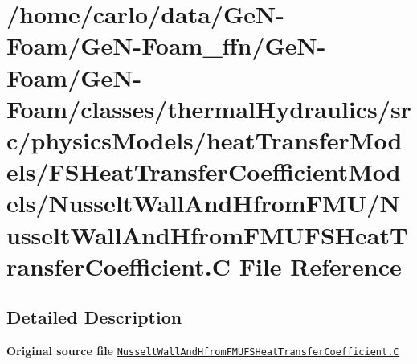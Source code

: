 \hypertarget{NusseltWallAndHfromFMUFSHeatTransferCoefficient_8C}{}\section{/home/carlo/data/\+Ge\+N-\/\+Foam/\+Ge\+N-\/\+Foam\+\_\+ffn/\+Ge\+N-\/\+Foam/\+Ge\+N-\/\+Foam/classes/thermal\+Hydraulics/src/physics\+Models/heat\+Transfer\+Models/\+F\+S\+Heat\+Transfer\+Coefficient\+Models/\+Nusselt\+Wall\+And\+Hfrom\+F\+M\+U/\+Nusselt\+Wall\+And\+Hfrom\+F\+M\+U\+F\+S\+Heat\+Transfer\+Coefficient.C File Reference}
\label{NusseltWallAndHfromFMUFSHeatTransferCoefficient_8C}


\subsection{Detailed Description}
{\bfseries Original source file} \href{../../../home/carlo/data/GeN-Foam/GeN-Foam_ffn/GeN-Foam/GeN-Foam/classes/thermalHydraulics/src/physicsModels/heatTransferModels/FSHeatTransferCoefficientModels/NusseltWallAndHfromFMU/NusseltWallAndHfromFMUFSHeatTransferCoefficient.C}{\tt Nusselt\+Wall\+And\+Hfrom\+F\+M\+U\+F\+S\+Heat\+Transfer\+Coefficient.\+C} 
